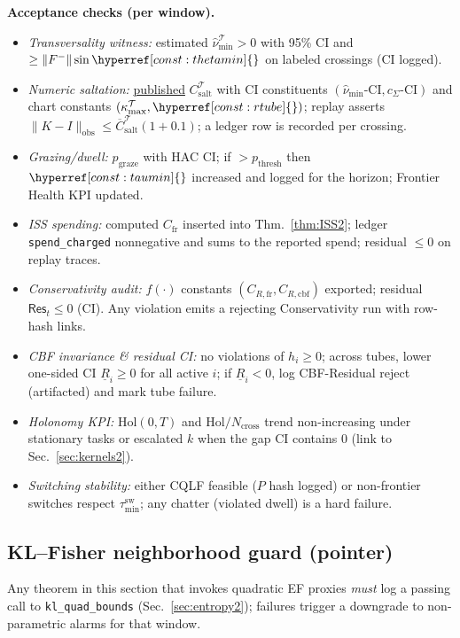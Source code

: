 \documentclass[10pt]{article}
\newcommand{\constref}[1]{\hyperref[const:#1]{\ensuremath{\csname constsym#1\endcsname}}}
\begin{document}
\begin{mdframed}
\textbf{Acceptance checks (per window).}
\begin{itemize}[leftmargin=*]
\item \emph{Transversality witness:} estimated $\hat\nu_{\min}^\mathcal T>0$ with 95\% CI and $\ge \|F^-\|\sin\constref{thetamin}$ on labeled crossings (CI logged).
\item \emph{Numeric saltation:} \underline{published} $C_{\mathrm{salt}}^\mathcal T$ with CI constituents $(\hat\nu_{\min}\text{-CI},c_\Sigma\text{-CI})$ and chart constants $(\kappa_{\max}^\mathcal T,\constref{rtube})$; replay asserts $\|K-I\|_{\text{obs}}\le \overline C_{\mathrm{salt}}^\mathcal T(1+0.1)$; a ledger row is recorded per crossing.
\item \emph{Grazing/dwell:} $p_{\mathrm{graze}}$ with HAC CI; if $>p_{\mathrm{thresh}}$ then $\constref{taumin}$ increased and logged for the horizon; Frontier Health KPI updated.
\item \emph{ISS spending:} computed $C_{\mathrm{fr}}$ inserted into Thm.~\ref{thm:ISS2}; ledger \texttt{spend\_charged} nonnegative and sums to the reported spend; residual $\le 0$ on replay traces.
\item \emph{Conservativity audit:} $f(\cdot)$ constants $(C_{R,\mathrm{fr}},C_{R,\mathrm{cbf}})$ exported; residual $\mathsf{Res}_t\le 0$ (CI). Any violation emits a rejecting \textsf{Conservativity} run with row-hash links.
\item \emph{CBF invariance \& residual CI:} no violations of $h_i\ge 0$; across tubes, lower one-sided CI $\underline R_i\ge 0$ for all active $i$; if $\underline R_i<0$, log \textsf{CBF-Residual} reject (artifacted) and mark tube failure.
\item \emph{Holonomy KPI:} $\mathrm{Hol}(0,T)$ and $\mathrm{Hol}/N_{\mathrm{cross}}$ trend non-increasing under stationary tasks or escalated $k$ when the gap CI contains $0$ (link to Sec.~\ref{sec:kernels2}).
\item \emph{Switching stability:} either CQLF feasible ($P$ hash logged) or non-frontier switches respect $\tau_{\min}^{\mathrm{sw}}$; any chatter (violated dwell) is a hard failure.
\end{itemize}
\end{mdframed}

\subsection*{KL--Fisher neighborhood guard (pointer)}
Any theorem in this section that invokes quadratic EF proxies \emph{must} log a passing call to \texttt{kl\_quad\_bounds} (Sec.~\ref{sec:entropy2}); failures trigger a downgrade to non-parametric alarms for that window.
\end{document}
